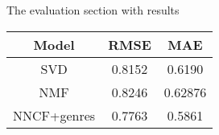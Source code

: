 The evaluation section with results

\begin{figure}[h!]
    \hfill
\end{figure}

\begin{center}
    \begin{tabular}{||c c c||} 
    \hline
    Model & RMSE & MAE \\ [0.5ex] 
    \hline
    SVD & 0.8152 & 0.6190 \\ 
    \hline
    NMF & 0.8246 & 0.62876 \\
    \hline
    NNCF+genres & 0.7763 & 0.5861 \\ [1ex]
    \hline
   \end{tabular}
\label{comparison}
\end{center}